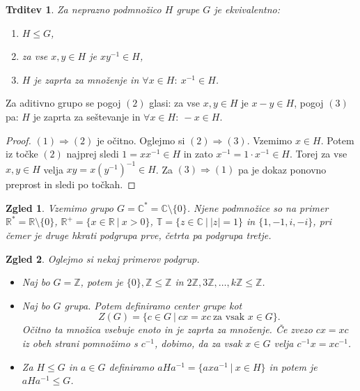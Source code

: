 \documentclass[10pt, a4paper]{article}
\newtheorem{trditev}[izr]{Trditev}
\newtheorem{zgled}{Zgled}[section]
\newenvironment{noticeC}{%
  \tcolorbox[%
  notitle,
  empty,
  enhanced,  %
  breakable,
  coltext=black, 
  fontupper=\rmfamily,
  noparskip,
  sharp corners,
  boxrule=-1pt,  %
  frame hidden,
  left=7pt,  %
  right=7pt,
  top=5pt,
  bottom=5pt,
  before skip=2.5ex plus 2pt,
  after skip=2.5ex plus 2pt,
  overlay unbroken and last={%
  },
  ]}
{\endtcolorbox}
\newenvironment{dokaz}%
  {\begin{noticeC}\begin{proof}}%
  {\end{proof}\end{noticeC}}
\newcommand{\Z}{\mathbb {Z}}
\newcommand{\R}{\mathbb {R}}
\newcommand{\C}{\mathbb {C}}
\begin{document}
\begin{trditev}
  Za neprazno podmnožico $H$ grupe $G$ je ekvivalentno:
  \begin{enumerate}
    \item $H \leq G$,
    \item za vse $x, y \in H$ je $x y^{-1} \in H$,
    \item $H$ je zaprta za množenje in $\forall x \in H:\ x^{-1} \in H$.
  \end{enumerate}
\end{trditev}

Za aditivno grupo se pogoj $(2)$ glasi: za vse $x, y \in H$ je $x - y \in H$, 
pogoj $(3)$ pa: $H$ je zaprta za seštevanje in $\forall x \in H:\ -x \in H$.

\begin{dokaz}
  $(1) \Rightarrow (2)$ je očitno. Oglejmo si $(2) \Rightarrow (3)$. Vzemimo $x \in H$.
  Potem iz točke $(2)$ najprej sledi $1 = x x^{-1} \in H$ in zato $x^{-1} = 1 \cdot x^{-1} \in H$.
  Torej za vse $x, y \in H$ velja $xy = x (y^{-1})^{-1} \in H$.
  Za $(3) \Rightarrow (1)$ pa je dokaz ponovno preprost in sledi po točkah.
\end{dokaz}

\begin{zgled}
  Vzemimo grupo $G = \C^* = \C \setminus \{0\}$. Njene podmnožice so na primer 
  $\R^* = \R \setminus \{0\}$, $\R^+ = \{x \in \R\ |\ x > 0\}$, $\mathbb{T} = \{z \in \C\ |\ |z| = 1\}$ in $\{1, -1, i, -i\}$,
  pri čemer je druge hkrati podgrupa prve, četrta pa podgrupa tretje.
\end{zgled}

\begin{zgled}
  Oglejmo si nekaj primerov podgrup.
  \begin{itemize}
    \item Naj bo $G = \Z$, potem je $\{0\}, \Z \leq \Z$ in $2 \Z, 3\Z, \dots, k \Z \leq \Z$.
    \item Naj bo $G$ grupa. Potem definiramo center grupe kot $$Z(G) = \{c \in G\ |\ cx = xc\ \text{za vsak $x \in G$}\}.$$
    Očitno ta množica vsebuje enoto in je zaprta za množenje. Če zvezo $cx = xc$ iz obeh strani pomnožimo s $c^{-1}$, dobimo,
    da za vsak $x \in G$ velja $c^{-1}x = xc^{-1}$.
    \item Za $H \leq G$ in $a \in G$ definiramo $aHa^{-1} = \{a x a^{-1}\ |\ x \in H\}$ in potem je $a H a^{-1} \leq G$.
  \end{itemize}
\end{zgled}
\end{document}

